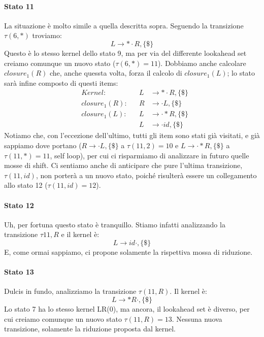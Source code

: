 \documentclass[class=book, crop=false, oneside, 12pt]{standalone}
\begin{document}
\paragraph{Stato 11}
La situazione è molto simile a quella descritta sopra. Seguendo la transizione \(\tau(6, \ast)\) troviamo:
\begin{equation*}
    L \to \ast \cdot R, \{\$\}
\end{equation*}
Questo è lo stesso kernel dello stato 9, ma per via del differente lookahead set creiamo comunque un nuovo stato (\(\tau(6, \ast) = 11\)). Dobbiamo anche calcolare \(closure_1(R)\) che, anche quessta volta, forza il calcolo di \(closure_1(L)\); lo stato sarà infine composto di questi items:
\begin{align*}
    &&Kernel: &&L &\to \ast \cdot R, \{\$\}& \\
    &&closure_1(R): &&R &\to \cdot L, \{\$\} &\\
    &&closure_1(L): &&L &\to \cdot \ast R, \{\$\}&\\
    && &&L &\to \cdot id,  \{\$\}&
\end{align*}
Notiamo che, con l'eccezione dell'ultimo, tutti gli item sono stati già visitati, e già sappiamo dove portano (\(R \to \cdot L, \{\$\}\) a \(\tau(11, 2) = 10\) e \(L \to \cdot \ast R, \{\$\}\) a \(\tau(11, \ast) = 11\), self loop), per cui ci risparmiamo di analizzare in futuro quelle mosse di shift. Ci sentiamo anche di anticipare che pure l'ultima transizione, \(\tau(11, id)\), non porterà a un nuovo stato, poiché risulterà essere un collegamento allo stato 12 (\(\tau(11, id) = 12\)).

\paragraph{Stato 12}
Uh, per fortuna questo stato è tranquillo. Stiamo infatti analizzando la transizione \(\tau 11, R\) e il kernel è:
\begin{equation*}
    L \to id \cdot, \{\$\}
\end{equation*}
E, come ormai sappiamo, ci propone solamente la rispettiva mossa di riduzione.

\paragraph{Stato 13}
Dulcis in fundo, analizziamo la transizione \(\tau(11, R)\). Il kernel è:
\begin{equation*}
    L \to \ast R \cdot , \{\$\}
\end{equation*}
Lo stato 7 ha lo stesso kernel LR(0), ma ancora, il lookahead set è diverso, per cui creiamo comunque un nuovo stato \(\tau(11, R) = 13\). Nessuna nuova transizione, solamente la riduzione proposta dal kernel.
\end{document}
